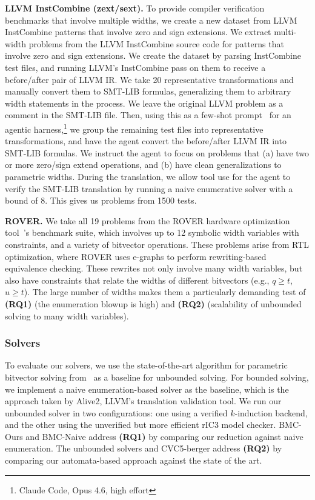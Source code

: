 \noindent\textbf{LLVM InstCombine (zext/sext).}
To provide compiler verification benchmarks that involve multiple widths, we create a new dataset from LLVM InstCombine patterns that involve zero and sign extensions.
We extract \SextZextInstcombineNumProblemsTotal{} multi-width problems
from the LLVM InstCombine source code for patterns that involve zero and sign extensions.
We create the dataset by parsing InstCombine test files, and running LLVM's InstCombine pass on them to receive a before/after pair of LLVM IR.
We take 20 representative transformations and manually convert them to SMT-LIB formulas, generalizing them to arbitrary width statements in the process.
We leave the original LLVM problem as a comment in the SMT-LIB file.
Then, using this as a few-shot prompt~\cite{brown2020language} for an agentic harness,\footnote{Claude Code, Opus 4.6, high effort}
we group the remaining test files into representative transformations, and have the agent convert the before/after LLVM IR into SMT-LIB formulas.
We instruct the agent to focus on problems that (a) have two or more zero/sign extend operations, and
(b) have clean generalizations to parametric widths. During the translation, we allow tool use for the agent
to verify the SMT-LIB translation by running a naive enumerative solver with a bound of $8$.
This gives us \SextZextInstcombineNumProblemsTotal{} problems from 1500 tests.

\noindent\textbf{ROVER.}
We take all 19 problems from the ROVER hardware optimization tool~\cite{DBLP:journals/tcad/CowardDC24}'s benchmark suite,
which involves up to 12 symbolic width variables with constraints, and a variety of bitvector operations.
These problems arise from RTL optimization, where ROVER uses e-graphs to perform rewriting-based equivalence checking.
These rewrites not only involve many width variables, but also have constraints that relate the widths of different bitvectors (e.g., $q \geq t$, $u \geq t$).
The large number of widths makes them a particularly demanding test of \textbf{(RQ1)} (the enumeration blowup is high) and \textbf{(RQ2)} (scalability of unbounded solving to many width variables).

\subsubsection{Solvers}

To evaluate our solvers, we use the state-of-the-art algorithm for parametric bitvector solving from~\citet{bit-precise-parametric-bv} as a baseline for unbounded solving.
For bounded solving, we implement a naive enumeration-based solver as the baseline, which is the approach taken by Alive2, LLVM's translation validation tool.
We run our unbounded solver in two configurations: one using a verified $k$-induction backend, and the other using the unverified but more efficient rIC3 model checker.
BMC-Ours and BMC-Naive address \textbf{(RQ1)} by comparing our reduction against naive enumeration.
The unbounded solvers and CVC5-berger address \textbf{(RQ2)} by comparing our automata-based approach against the state of the art.


